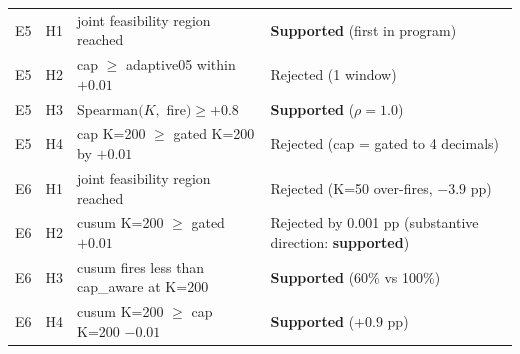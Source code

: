 \begin{table}[!t]
\begin{tabular}{@{}llp{7.2cm}p{4.2cm}@{}}
    \midrule
    E5 & H1 & joint feasibility region reached & \textbf{Supported} (first in program) \\
    E5 & H2 & cap $\geq$ adaptive05 within $+0.01$ & Rejected (1 window) \\
    E5 & H3 & Spearman$(K, $ fire$) \geq +0.8$ & \textbf{Supported} ($\rho = 1.0$) \\
    E5 & H4 & cap K=200 $\geq$ gated K=200 by $+0.01$ & Rejected (cap = gated to 4 decimals) \\
    \midrule
    E6 & H1 & joint feasibility region reached & Rejected (K=50 over-fires, $-3.9$ pp) \\
    E6 & H2 & cusum K=200 $\geq$ gated $+0.01$ & Rejected by 0.001 pp (substantive direction: \textbf{supported}) \\
    E6 & H3 & cusum fires less than cap\_aware at K=200 & \textbf{Supported} (60\% vs 100\%) \\
    E6 & H4 & cusum K=200 $\geq$ cap K=200 $-0.01$ & \textbf{Supported} ($+0.9$ pp) \\
    \bottomrule
  \end{tabular}
\end{table}
